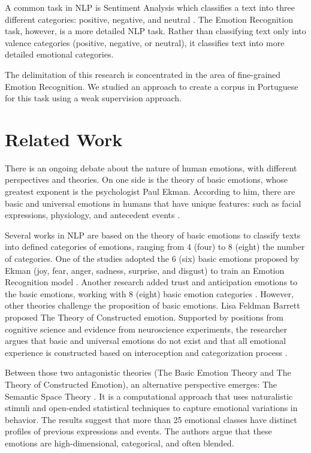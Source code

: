 \documentclass[12pt]{article}
\begin{document}
A common task in NLP is Sentiment Analysis which classifies a text into three different categories: positive, negative, and neutral \cite{Drus2019}. The Emotion Recognition task, however, is a more detailed NLP task. Rather than classifying text only into valence categories (positive, negative, or neutral), it classifies text into more detailed emotional categories.

The delimitation of this research is concentrated in the area of fine-grained Emotion Recognition. We studied an approach to create a corpus in Portuguese for this task using a weak supervision approach.

\section{Related Work}
\label{sec:related-work}

There is an ongoing debate about the nature of human emotions, with different perspectives and theories. On one side is the theory of basic emotions, whose greatest exponent is the psychologist Paul Ekman. According to him, there are basic and universal emotions in humans that have unique features: such as facial expressions, physiology, and antecedent events \cite{Ekman1992}.

Several works in NLP are based on the theory of basic emotions to classify texts into defined categories of emotions, ranging from 4 (four) to 8 (eight) the number of categories. One of the studies adopted the 6 (six) basic emotions proposed by Ekman (joy, fear, anger, sadness, surprise, and disgust) to train an Emotion Recognition model \cite{Batbaatar2019}. Another research added trust and anticipation emotions to the basic emotions, working with 8 (eight) basic emotion categories \cite{Sosea2020}.
However, other theories challenge the proposition of basic emotions. Lisa Feldman Barrett proposed The Theory of Constructed emotion. Supported by positions from cognitive science and evidence from neuroscience experiments, the researcher argues that basic and universal emotions do not exist and that all emotional experience is constructed based on interoception and categorization process \cite{Barrett2016}.

Between those two antagonistic theories (The Basic Emotion Theory and The Theory of Constructed Emotion), an alternative perspective emerges: The Semantic Space Theory \cite{Cowen2021}. It is a computational approach that uses naturalistic stimuli and open-ended statistical techniques to capture emotional variations in behavior. The results suggest that more than 25 emotional classes have distinct profiles of previous expressions and events. The authors argue that these emotions are high-dimensional, categorical, and often blended.
\end{document}
